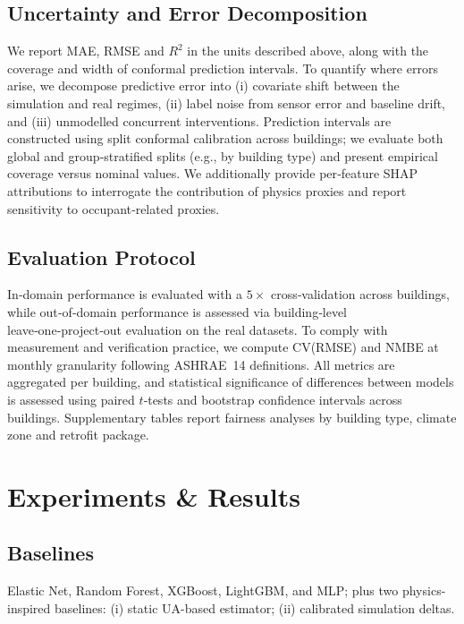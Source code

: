 ﻿\documentclass{article}
\begin{document}
\subsection{Uncertainty and Error Decomposition}
We report MAE, RMSE and $R^2$ in the units described above, along with the coverage and width of conformal prediction intervals.
To quantify where errors arise, we decompose predictive error into (i) covariate shift between the simulation and real regimes, (ii) label noise from sensor error and baseline drift, and (iii) unmodelled concurrent interventions.
Prediction intervals are constructed using split conformal calibration across buildings;
we evaluate both global and group‑stratified splits (e.g., by building type) and present empirical coverage versus nominal values.
We additionally provide per‑feature SHAP attributions to interrogate the contribution of physics proxies and report sensitivity to occupant‑related proxies.
\subsection{Evaluation Protocol}
In‑domain performance is evaluated with a $5\times$ cross‑validation across buildings, while out‑of‑domain performance is assessed via building‑level leave‑one‑project‑out evaluation on the real datasets.
To comply with measurement and verification practice, we compute CV(RMSE) and NMBE at monthly granularity following ASHRAE~14 definitions.
All metrics are aggregated per building, and statistical significance of differences between models is assessed using paired $t$‑tests and bootstrap confidence intervals across buildings.
Supplementary tables report fairness analyses by building type, climate zone and retrofit package.
\section{Experiments \& Results}
\subsection{Baselines}
Elastic Net, Random Forest, XGBoost, LightGBM, and MLP; plus two physics-inspired baselines: (i) static UA-based estimator;
(ii) calibrated simulation deltas.
\end{document}
